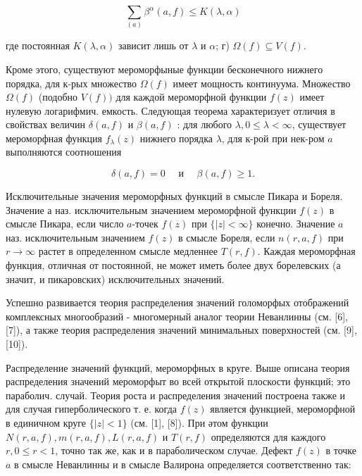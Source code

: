 \documentclass[10pt]{article}
\begin{document}
\[

\sum_{(a)} \beta^{\alpha}(a, f) \leqslant K(\lambda, \alpha)

\]



где постоянная $K(\lambda, \alpha)$ зависит лишь от $\lambda$ и $\alpha$; г) $\Omega(f) \subseteq V(f)$.



Кроме этого, существуют мероморфыные функции бесконечного нижнего порядка, для к-рых множество $\Omega(f)$ имеет мощность континуума. Множество $\Omega(f)$ (подобно $V(f))$ для каждой мероморфной функции $f(z)$ имеет нулевую логарифмич. емкость. Следующая теорема характеризует отличия в свойствах величин $\delta(a, f)$ и $\beta(a, f)$ : для любого $\lambda, 0 \leqslant \lambda<\infty$, существует мероморфная функция $f_{\lambda}(z)$ нижнего порядка $\lambda$, для к-рой при нек-ром $a$ выполняются соотношения



\[

\delta(a, f)=0 \quad \text { и } \quad \beta(a, f) \geqslant 1 .

\]



Исключительные значения мероморфных функций в смысле Пикара и Бореля. Значение а наз. исключительным значением мероморфной функции $f(z)$ в смысле Пикара, если число $a$-точек $f(z)$ при $\{|z|<\infty\}$ конечно. Значение $a$ наз. исключительным значением $f(z)$ в смысле Бореля, если $n(r, a, f)$ при $r \rightarrow \infty$ растет в определенном смысле медленнее $T(r, f)$. Каждая мероморфная функция, отличная от постоянной, не может иметь более двух борелевских (а значит, и пикаровских) исключительных значений.



Успешно развивается теория распределения значений голоморфых отображений комплексных многообразий - многомерный аналог теории Неванлинны (см. [6], [7]), а также теория распределения значений минимальных поверхностей (см. [9], [10]).



Распределение значений функций, мероморфных в круге. Выше описана теория распределения значений мероморфыт во всей открытой плоскости функций; это параболич. случай. Теория роста и распределения значений построена также и для случая гиперболического т. е. когда $f(z)$ является функцией, мероморфной в единичном круге $\{|z|<1\}$ (см. [1], [8]). При әтом функции $N(r, a, f), m(r, a, f), L(r, a, f)$ и $T(r, f)$ определяются для каждого $r, 0 \leqslant r<1$, точно так же, как и в параболическом случае. Дефект $f(z)$ в точке $a$ в смысле Неванлинны и в смысле Валирона определяется соответственно так:
\end{document}
